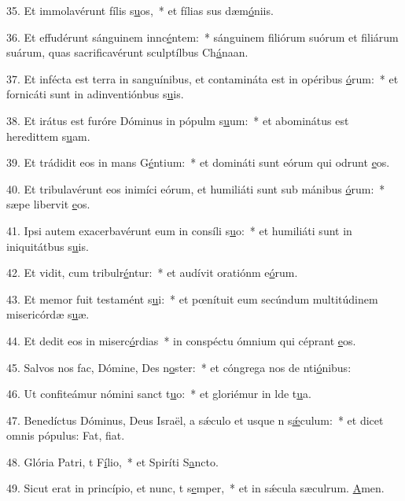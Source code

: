 35. Et immolavérunt fílis s\uline{u}os,~* et fílias sus dæm\uline{ó}niis.\par 
36. Et effudérunt sánguinem innc\uline{é}ntem:~* sánguinem filiórum suórum et filiárum suárum, quas sacrificavérunt sculptílbus Ch\uline{á}naan.\par 
37. Et infécta est terra in sanguínibus, et contamináta est in opéribus \uline{ó}rum:~* et fornicáti sunt in adinventiónbus s\uline{u}is.\par 
38. Et irátus est furóre Dóminus in pópulm s\uline{u}um:~* et abominátus est heredittem s\uline{u}am.\par 
39. Et trádidit eos in mans G\uline{é}ntium:~* et domináti sunt eórum qui odrunt \uline{e}os.\par 
40. Et tribulavérunt eos inimíci eórum, et humiliáti sunt sub mánibus \uline{ó}rum:~* sæpe libervit \uline{e}os.\par 
41. Ipsi autem exacerbavérunt eum in consíli s\uline{u}o:~* et humiliáti sunt in iniquitátbus s\uline{u}is.\par 
42. Et vidit, cum tribulr\uline{é}ntur:~* et audívit oratiónm e\uline{ó}rum.\par 
43. Et memor fuit testamént s\uline{u}i:~* et pœnítuit eum secúndum multitúdinem misericórdæ s\uline{u}æ.\par 
44. Et dedit eos in miserc\uline{ó}rdias~* in conspéctu ómnium qui céprant \uline{e}os.\par 
45. Salvos nos fac, Dómine, Des n\uline{o}ster:~* et cóngrega nos de nti\uline{ó}nibus:\par 
46. Ut confiteámur nómini sanct t\uline{u}o:~* et gloriémur in lde t\uline{u}a.\par 
47. Benedíctus Dóminus, Deus Israël, a sǽculo et usque n s\uline{ǽ}culum:~* et dicet omnis pópulus: Fat, f\uline{i}at.\par 
48. Glória Patri, t F\uline{í}lio,~* et Spiríti S\uline{a}ncto.\par 
49. Sicut erat in princípio, et nunc, t s\uline{e}mper,~* et in sǽcula sæculrum. \uline{A}men.\par 
